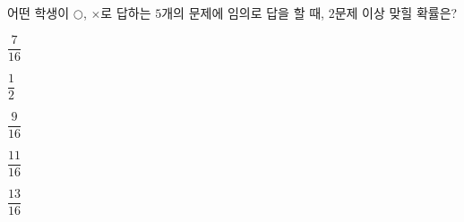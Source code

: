 어떤 학생이 $\bigcirc$, $\times$로 답하는 $5$개의 문제에 임의로 답을 할 때, $2$문제 이상 맞힐 확률은?
\begin{choices32}{\rule[-3ex]{0pt}{8ex}$\dfrac{7}{16}$}{\rule[-3ex]{0pt}{8ex}$\dfrac{1}{2}$}{\rule[-3ex]{0pt}{8ex}$\dfrac{9}{16}$}{\rule[-3ex]{0pt}{8ex}$\dfrac{11}{16}$}{\rule[-3ex]{0pt}{8ex}$\dfrac{13}{16}$}\end{choices32}
